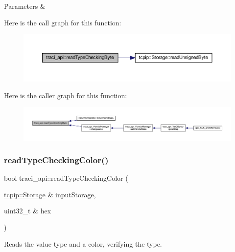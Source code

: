 \begin{DoxyParams}{Parameters}
{\em } & \\
\hline
\end{DoxyParams}
Here is the call graph for this function\+:\nopagebreak
\begin{figure}[H]
\begin{center}
\leavevmode
\includegraphics[width=350pt]{namespacetraci__api_aee58441392da7b83ecd8c8831271e945_cgraph}
\end{center}
\end{figure}
Here is the caller graph for this function\+:\nopagebreak
\begin{figure}[H]
\begin{center}
\leavevmode
\includegraphics[width=350pt]{namespacetraci__api_aee58441392da7b83ecd8c8831271e945_icgraph}
\end{center}
\end{figure}
\mbox{\label{namespacetraci__api_af8c7656fbd212acb13f037d4fb20f1f7}} 
\subsubsection{\texorpdfstring{read\+Type\+Checking\+Color()}{readTypeCheckingColor()}}
{\footnotesize\ttfamily bool traci\+\_\+api\+::read\+Type\+Checking\+Color (\begin{DoxyParamCaption}\item[{\hyperlink{classtcpip_1_1_storage}{tcpip\+::\+Storage} \&}]{input\+Storage,  }\item[{uint32\+\_\+t \&}]{hex }\end{DoxyParamCaption})}



Reads the value type and a color, verifying the type. 



